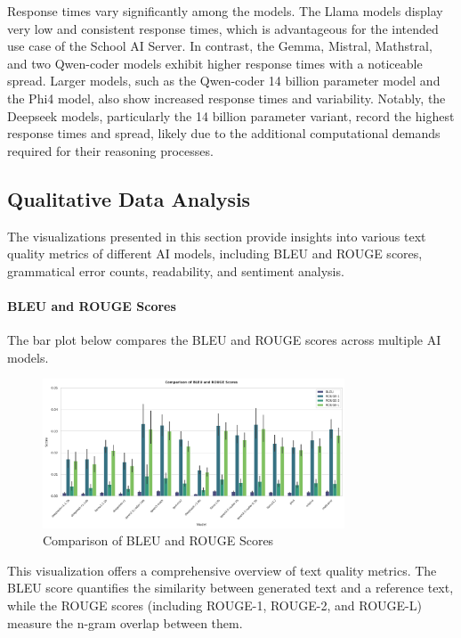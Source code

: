 Response times vary significantly among the models. The Llama models display very low and consistent response times, which is advantageous for the intended use case of the School AI Server. In contrast, the Gemma, Mistral, Mathstral, and two Qwen-coder models exhibit higher response times with a noticeable spread. Larger models, such as the Qwen-coder 14 billion parameter model and the Phi4 model, also show increased response times and variability. Notably, the Deepseek models, particularly the 14 billion parameter variant, record the highest response times and spread, likely due to the additional computational demands required for their reasoning processes.

\subsection{Qualitative Data Analysis}

The visualizations presented in this section provide insights into various text quality metrics of different AI models, including BLEU and ROUGE scores, grammatical error counts, readability, and sentiment analysis.

\paragraph{BLEU and ROUGE Scores}

The bar plot below compares the BLEU and ROUGE scores across multiple AI models.

\begin{figure}[H]
  \centering
  \includegraphics[width=0.8\textwidth]{figures/scores/bleu_rouge.png}
  \caption{Comparison of BLEU and ROUGE Scores}
  \label{fig:bleu_rouge}
\end{figure}

This visualization offers a comprehensive overview of text quality metrics. The BLEU score quantifies the similarity between generated text and a reference text, while the ROUGE scores (including ROUGE-1, ROUGE-2, and ROUGE-L) measure the n-gram overlap between them.

